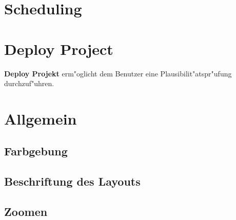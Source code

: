 \documentclass[a4paper,titlepage,12pt,ngerman]{scrbook}
\begin{document}
\section{Scheduling}
\section{Deploy Project}
{\bf Deploy Projekt} erm"oglicht dem Benutzer eine Plausibilit"atspr"ufung durchzuf"uhren.
\section{Allgemein}
\subsection{Farbgebung}
\subsection{Beschriftung des Layouts}
\subsection{Zoomen}


\end{document}

